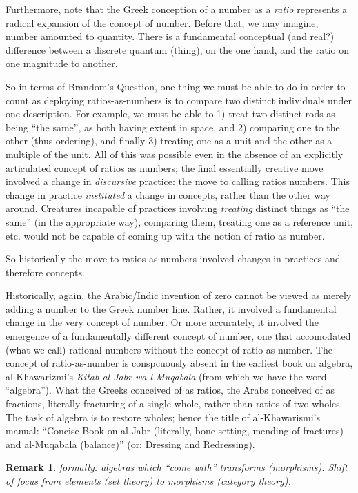 \documentclass[11pt,twoside]{article}
\newtheorem{remark}{Remark}
\begin{document}
Furthermore, note that the Greek conception of a number as a
\textit{ratio} represents a radical expansion of the concept of
number.  Before that, we may imagine, number amounted to quantity.
There is a fundamental conceptual (and real?) difference between a
discrete quantum (thing), on the one hand, and the ratio on one
magnitude to another.

So in terms of Brandom's Question, one thing we must be able to do in
order to count as deploying ratios-as-numbers is to compare two
distinct individuals under one description.  For example, we must be
able to 1) treat two distinct rods as being ``the same'', as both
having extent in space, and 2) comparing one to the other (thus
ordering), and finally 3) treating one as a unit and the other as a
multiple of the unit.  All of this was possible even in the absence of
an explicitly articulated concept of ratios as numbers; the final
essentially creative move involved a change in \textit{discursive}
practice: the move to calling ratios numbers.  This change in practice
\textit{instituted} a change in concepts, rather than the other way
around.  Creatures incapable of practices involving \textit{treating}
distinct things as ``the same'' (in the appropriate way), comparing
them, treating one as a reference unit, etc. would not be capable of
coming up with the notion of ratio as number.

So historically the move to ratios-as-numbers involved changes in
practices and therefore concepts.

Historically, again, the Arabic/Indic invention of zero cannot be
viewed as merely adding a number to the Greek number line.  Rather, it
involved a fundamental change in the very concept of number.  Or more
accurately, it involved the emergence of a fundamentally different
concept of number, one that accomodated (what we call) rational
numbers without the concept of ratio-as-number.  The concept of
ratio-as-number is conspcuously absent in the earliest book on
algebra, al-Khawarizmi's \textit{Kitab al-Jabr wa-l-Muqabala} (from
which we have the word ``algebra'').  What the Greeks conceived of as
ratios, the Arabs conceived of as fractions, literally fracturing of a
single whole, rather than ratios of two wholes.  The task of algebra is to
restore wholes; hence the title of al-Khawarismi's manual: ``Concise
Book on al-Jabr (literally, bone-setting, mending of fractures) and
al-Muqabala (balance)'' (or: Dressing and Redressing).

\begin{remark}
  formally: algebras which ``come with'' transforms (morphisms).
  Shift of focus from elements (set theory) to morphisms (category
  theory).
\end{remark}
\end{document}
